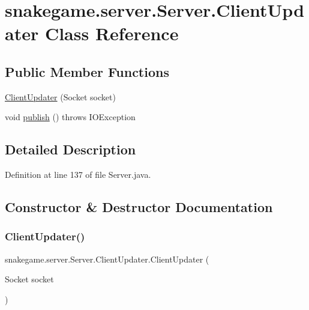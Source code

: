 \hypertarget{classsnakegame_1_1server_1_1_server_1_1_client_updater}{}\section{snakegame.\+server.\+Server.\+Client\+Updater Class Reference}
\label{classsnakegame_1_1server_1_1_server_1_1_client_updater}
\subsection*{Public Member Functions}
\begin{DoxyCompactItemize}
\item 
\mbox{\hyperlink{classsnakegame_1_1server_1_1_server_1_1_client_updater_a7cb2b186e3342d82f6e9b587ae5d22a4}{Client\+Updater}} (Socket socket)
\item 
void \mbox{\hyperlink{classsnakegame_1_1server_1_1_server_1_1_client_updater_a6a2031e0b0fdd55cf7d5c0eeb0b1e267}{publish}} ()  throws I\+O\+Exception 
\end{DoxyCompactItemize}


\subsection{Detailed Description}


Definition at line 137 of file Server.\+java.



\subsection{Constructor \& Destructor Documentation}
\mbox{\label{classsnakegame_1_1server_1_1_server_1_1_client_updater_a7cb2b186e3342d82f6e9b587ae5d22a4}} 
\subsubsection{\texorpdfstring{Client\+Updater()}{ClientUpdater()}}
{\footnotesize\ttfamily snakegame.\+server.\+Server.\+Client\+Updater.\+Client\+Updater (\begin{DoxyParamCaption}\item[{Socket}]{socket }\end{DoxyParamCaption})}



